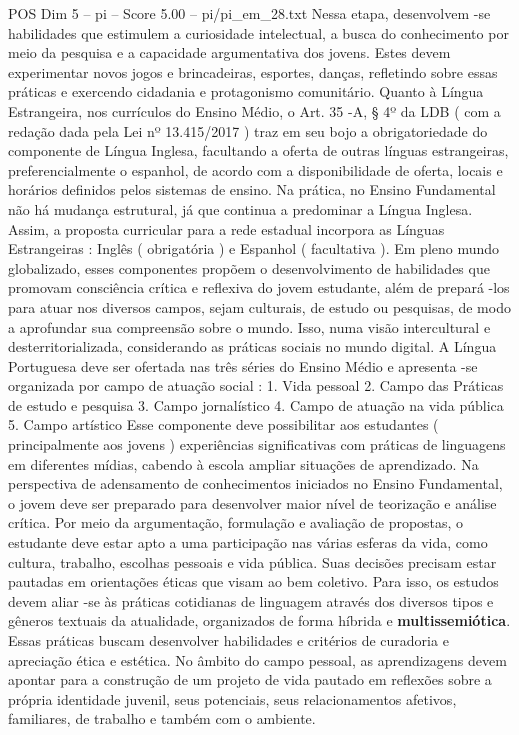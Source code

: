 \begin{textsample}{POS Dim 5 – pi – Score 5.00 – pi/pi\_em\_28.txt}
Nessa etapa, desenvolvem -se habilidades que estimulem a curiosidade intelectual, a busca do conhecimento por meio da pesquisa e a capacidade argumentativa dos jovens.
Estes devem experimentar novos jogos e brincadeiras, esportes, danças, refletindo sobre essas práticas e exercendo cidadania e protagonismo comunitário.
Quanto à Língua Estrangeira, nos currículos do Ensino Médio, o Art. 35 -A, § 4º da LDB ( com a redação dada pela Lei nº 13.415/2017 ) traz em seu bojo a obrigatoriedade do componente de Língua Inglesa, facultando a oferta de outras línguas estrangeiras, preferencialmente o espanhol, de acordo com a disponibilidade de oferta, locais e horários definidos pelos sistemas de ensino.
Na prática, no Ensino Fundamental não há mudança estrutural, já que continua a predominar a Língua Inglesa.
Assim, a proposta curricular para a rede estadual incorpora as Línguas Estrangeiras : Inglês ( obrigatória ) e Espanhol ( facultativa ).
Em pleno mundo globalizado, esses componentes propõem o desenvolvimento de habilidades que promovam consciência crítica e reflexiva do jovem estudante, além de prepará -los para atuar nos diversos campos, sejam culturais, de estudo ou pesquisas, de modo a aprofundar sua compreensão sobre o mundo.
Isso, numa visão intercultural e desterritorializada, considerando as práticas sociais no mundo digital.
A Língua Portuguesa deve ser ofertada nas três séries do Ensino Médio e apresenta -se organizada por campo de atuação social : 1.
Vida pessoal 2.
Campo das Práticas de estudo e pesquisa 3.
Campo jornalístico 4.
Campo de atuação na vida pública 5.
Campo artístico Esse componente deve possibilitar aos estudantes ( principalmente aos jovens ) experiências significativas com práticas de linguagens em diferentes mídias, cabendo à escola ampliar situações de aprendizado.
Na perspectiva de adensamento de conhecimentos iniciados no Ensino Fundamental, o jovem deve ser preparado para desenvolver maior nível de teorização e análise crítica.
Por meio da argumentação, formulação e avaliação de propostas, o estudante deve estar apto a uma participação nas várias esferas da vida, como cultura, trabalho, escolhas pessoais e vida pública.
Suas decisões precisam estar pautadas em orientações éticas que visam ao bem coletivo.
Para isso, os estudos devem aliar -se às práticas cotidianas de linguagem através dos diversos tipos e gêneros textuais da atualidade, organizados de forma híbrida e \textbf{multissemiótica}.
Essas práticas buscam desenvolver habilidades e critérios de curadoria e apreciação ética e estética.
No âmbito do campo pessoal, as aprendizagens devem apontar para a construção de um projeto de vida pautado em reflexões sobre a própria identidade juvenil, seus potenciais, seus relacionamentos afetivos, familiares, de trabalho e também com o ambiente.

\end{textsample}
